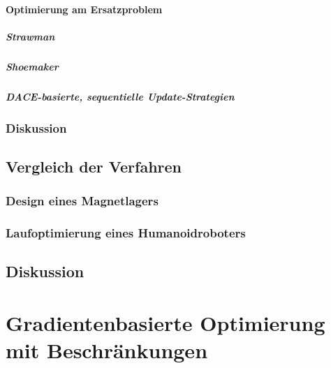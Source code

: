 			\subsubsection{Optimierung am Ersatzproblem} %

				\paragraph{Strawman} %

				\paragraph{Shoemaker} %

				\paragraph{DACE-basierte, sequentielle Update-Strategien} %

		\subsection{Diskussion} %

	\section{Vergleich der Verfahren} %

		\subsection{Design eines Magnetlagers} %

		\subsection{Laufoptimierung eines Humanoidroboters} %

	\section{Diskussion} %

\chapter{Gradientenbasierte Optimierung mit Beschränkungen} %

